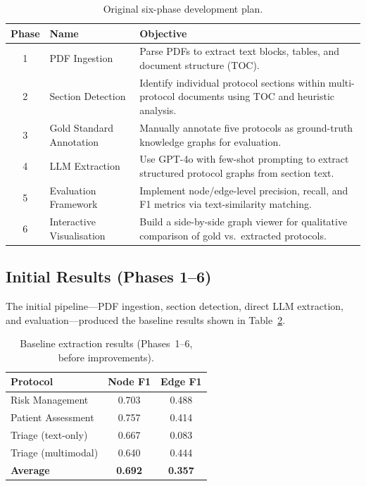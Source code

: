 \documentclass[12pt,a4paper]{article}
\begin{document}
\begin{table}[H]
\centering
\caption{Original six-phase development plan.}
\label{tab:phases}
\begin{tabularx}{\textwidth}{c l X}
\toprule
\textbf{Phase} & \textbf{Name} & \textbf{Objective} \\
\midrule
1 & PDF Ingestion & Parse PDFs to extract text blocks, tables, and document structure (TOC). \\
2 & Section Detection & Identify individual protocol sections within multi-protocol documents using TOC and heuristic analysis. \\
3 & Gold Standard Annotation & Manually annotate five protocols as ground-truth knowledge graphs for evaluation. \\
4 & LLM Extraction & Use GPT-4o with few-shot prompting to extract structured protocol graphs from section text. \\
5 & Evaluation Framework & Implement node/edge-level precision, recall, and F1 metrics via text-similarity matching. \\
6 & Interactive Visualisation & Build a side-by-side graph viewer for qualitative comparison of gold vs.\ extracted protocols. \\
\bottomrule
\end{tabularx}
\end{table}

\subsection{Initial Results (Phases 1--6)}

The initial pipeline---PDF ingestion, section detection, direct LLM extraction, and evaluation---produced the baseline results shown in Table~\ref{tab:baseline}.

\begin{table}[H]
\centering
\caption{Baseline extraction results (Phases~1--6, before improvements).}
\label{tab:baseline}
\begin{tabular}{l c c}
\toprule
\textbf{Protocol} & \textbf{Node F1} & \textbf{Edge F1} \\
\midrule
Risk Management       & 0.703 & 0.488 \\
Patient Assessment    & 0.757 & 0.414 \\
Triage (text-only)    & 0.667 & 0.083 \\
Triage (multimodal)   & 0.640 & 0.444 \\
\midrule
\textbf{Average}      & \textbf{0.692} & \textbf{0.357} \\
\bottomrule
\end{tabular}
\end{table}
\end{document}
